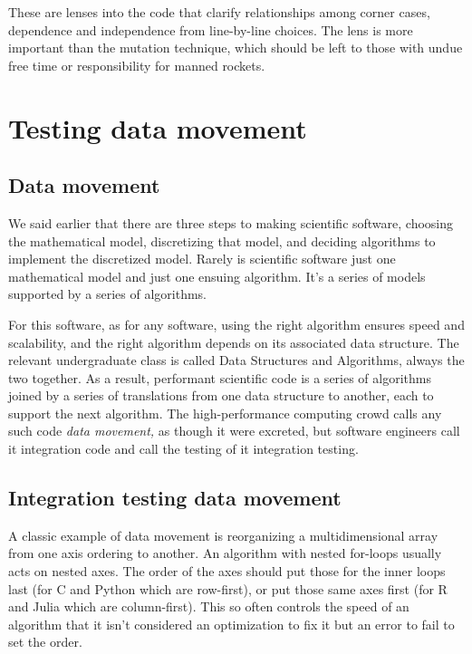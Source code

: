 \documentclass[fleqn,10pt]{olplainarticle}
\begin{document}
These are lenses into the code that clarify relationships
among corner cases, dependence and independence from
line-by-line choices. The lens is more important than the
mutation technique, which should be left to those with
undue free time or responsibility for manned rockets.


\section{Testing data movement}\label{sec:data-movement}

\subsection{Data movement}

We said earlier that there are three steps to making scientific
software, choosing the mathematical model, discretizing that
model, and deciding algorithms to implement the discretized model.
Rarely is scientific software just one mathematical model
and just one ensuing algorithm. It's a series of models supported
by a series of algorithms.

For this software, as for any software, using the right algorithm
ensures speed and scalability, and the right algorithm depends on
its associated data structure. The relevant undergraduate class
is called Data Structures and Algorithms, always the two together.
As a result, performant scientific code is a series of algorithms
joined by a series of translations from one data structure to
another, each to support the next algorithm. The high-performance
computing crowd calls any such code \emph{data movement,} as though
it were excreted, but software engineers call it integration code
and call the testing of it integration testing.

\subsection{Integration testing data movement}

A classic example of data movement is reorganizing a multidimensional
array from one axis ordering to another. An algorithm with nested
for-loops usually acts on nested axes. The order of the axes should
put those for the inner loops last (for C and Python which are row-first), or put those
same axes first (for R and Julia which are column-first). This so
often controls the speed of an algorithm that it isn't considered an 
optimization to fix it but an error to fail to set the order.
\end{document}
